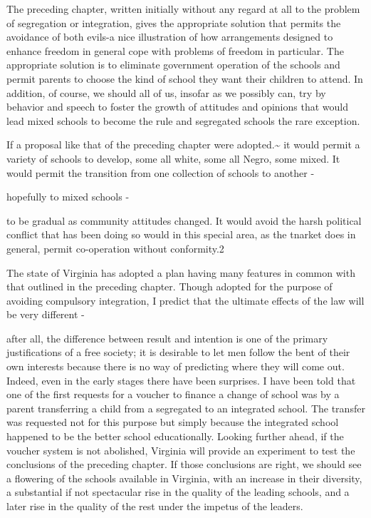 \documentclass[11pt,openany]{book}
\begin{document}
The preceding chapter, written initially without any regard at all to the problem of segregation or integration, gives the appropriate solution that permits the avoidance of both evils-a nice illustration of how arrangements designed to enhance freedom in general cope with problems of freedom in particular. The appropriate solution is to eliminate government operation of the schools and permit parents to choose the kind of school they want their children to attend. In addition, of course, we should all of us, insofar as we possibly can, try by behavior and speech to foster the growth of attitudes and opinions that would lead mixed schools to become the rule and segregated schools the rare exception.

If a proposal like that of the preceding chapter were adopted.\textasciitilde{} it would permit a variety of schools to develop, some all white, some all Negro, some mixed. It would permit the transition from one collection of schools to another -

hopefully to mixed schools -

to be gradual as community attitudes changed. It would avoid the harsh political conflict that has been doing so would in this special area, as the tnarket does in general, permit co-operation without conformity.2

The state of Virginia has adopted a plan having many features in common with that outlined in the preceding chapter. Though adopted for the purpose of avoiding compulsory integration, I predict that the ultimate effects of the law will be very different -

after all, the difference between result and intention is one of the primary justifications of a free society; it is desirable to let men follow the bent of their own interests because there is no way of predicting where they will come out. Indeed, even in the early stages there have been surprises. I have been told that one of the first requests for a voucher to finance a change of school was by a parent transferring a child from a segregated to an integrated school. The transfer was requested not for this purpose but simply because the integrated school happened to be the better school educationally. Looking further ahead, if the voucher system is not abolished, Virginia will provide an experiment to test the conclusions of the preceding chapter. If those conclusions are right, we should see a flowering of the schools available in Virginia, with an increase in their diversity, a substantial if not spectacular rise in the quality of the leading schools, and a later rise in the quality of the rest under the impetus of the leaders.
\end{document}

